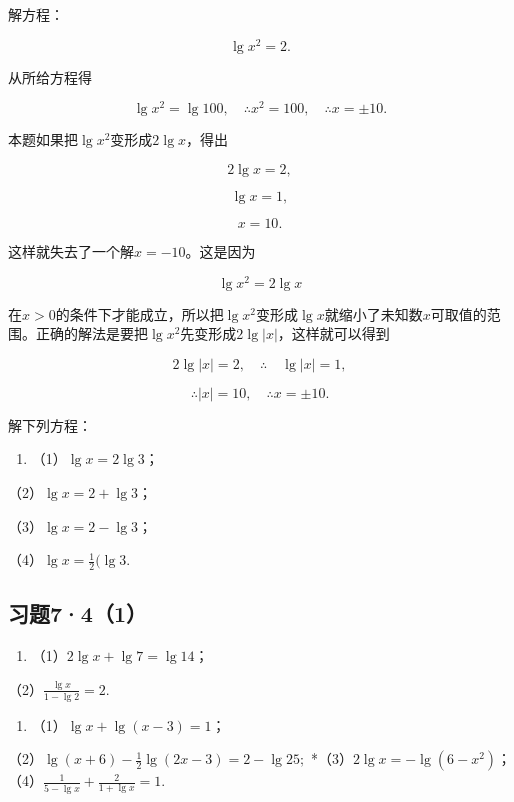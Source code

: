 解方程：

\[
\lg x^{2} = 2.
\]

 从所给方程得

\[
\lg x^{2} = \lg 100, \quad \therefore x^{2} = 100, \quad \therefore x = \pm 10.
\]

 本题如果把\(\lg x^2\)变形成\(2\lg x\)，得出

\[
2 \lg x = 2,
\]

\[
\lg x = 1,
\]

\[
x = 10.
\]

这样就失去了一个解\(x = -10\)。这是因为

\[
\lg x^{2} = 2 \lg x
\]

在\(x > 0\)的条件下才能成立，所以把\(\lg x^2\)变形成\(\lg x\)就缩小了未知数\(x\)可取值的范围。正确的解法是要把\(\lg x^2\)先变形成\(2\lg |x|\)，这样就可以得到

\[
2 \lg | x | = 2, \quad \therefore \quad \lg | x | = 1,
\]

\[
\therefore | x | = 10, \quad \therefore x = \pm 10.
\]

解下列方程：

\begin{enumerate}
\item
  （1）\(\lg x = 2\lg 3\)；
\end{enumerate}

（2）\(\lg x = 2 + \lg 3\)；

（3）\(\lg x = 2 - \lg 3\)；

（4）\(\lg x = \frac{1}{2} (\lg 3.\)

\subsection{习题7·4（1）}

\begin{enumerate}[start=2]
\item
  （1）\(2\lg x + \lg 7 = \lg 14\)；
\end{enumerate}

（2）\(\frac{\lg x}{1 - \lg 2} = 2.\)

\begin{enumerate}[start=3]
\item
  （1）\(\lg x + \lg (x - 3) = 1\)；
\end{enumerate}

（2）\(\lg (x + 6) - \frac{1}{2}\lg (2x - 3) = 2 - \lg 25;\)
*（3）\(2\lg x = -\lg (6 - x^2)\)；（4）\(\frac{1}{5 - \lg x} + \frac{2}{1 + \lg x} = 1.\)

